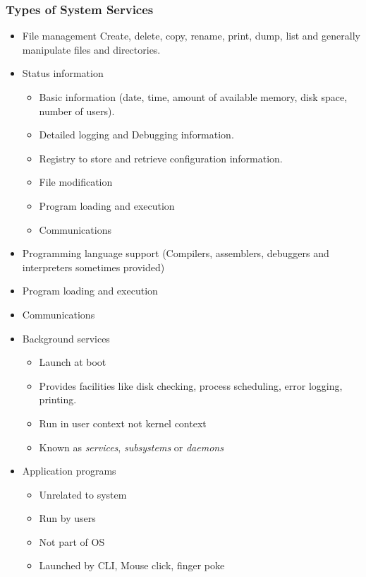 \documentclass[]{article}
\begin{document}
\subsubsection*{Types of System Services}
\begin{itemize}
    \item File management
        \subitem Create, delete, copy, rename, print, dump, list and generally manipulate files and directories.
    \item Status information
    \begin{itemize}
        \item Basic information (date, time, amount of available memory, disk space, number of users).
        \item Detailed logging and Debugging information.
        \item Registry to store and retrieve configuration information.
        \item File modification
        \item Program loading and execution
        \item Communications
    \end{itemize}
    \item Programming language support (Compilers, assemblers,
    debuggers and interpreters sometimes provided)
    \item Program loading and execution
    \item Communications
    \item Background services
    \begin{itemize}
        \item Launch at boot
        \item Provides facilities like disk checking, process scheduling, error logging, printing.
        \item Run in user context not kernel context
        \item Known as \emph{services}, \emph{subsystems} or \emph{daemons}
    \end{itemize}
    \item Application programs
    \begin{itemize}
        \item Unrelated to system
        \item Run by users
        \item Not part of OS
        \item Launched by CLI, Mouse click, finger poke
    \end{itemize}
\end{itemize}
\end{document}
